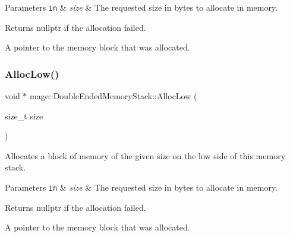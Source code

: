 \begin{DoxyParams}[1]{Parameters}
\mbox{\tt in}  & {\em size} & The requested size in bytes to allocate in memory. \\
\hline
\end{DoxyParams}
\begin{DoxyReturn}{Returns}
{\ttfamily nullptr} if the allocation failed. 

A pointer to the memory block that was allocated. 
\end{DoxyReturn}
\mbox{\label{classmage_1_1_double_ended_memory_stack_a4eece9ca8748f77783e8235c6192b260}} 
\subsubsection{\texorpdfstring{Alloc\+Low()}{AllocLow()}}
{\footnotesize\ttfamily void $\ast$ mage\+::\+Double\+Ended\+Memory\+Stack\+::\+Alloc\+Low (\begin{DoxyParamCaption}\item[{size\+\_\+t}]{size }\end{DoxyParamCaption})\hspace{0.3cm}{\ttfamily [noexcept]}}

Allocates a block of memory of the given size on the low side of this memory stack.


\begin{DoxyParams}[1]{Parameters}
\mbox{\tt in}  & {\em size} & The requested size in bytes to allocate in memory. \\
\hline
\end{DoxyParams}
\begin{DoxyReturn}{Returns}
{\ttfamily nullptr} if the allocation failed. 

A pointer to the memory block that was allocated. 
\end{DoxyReturn}
\mbox{\label{classmage_1_1_double_ended_memory_stack_a6f2d4036e67cca2836293ad421ddfdfd}} 
